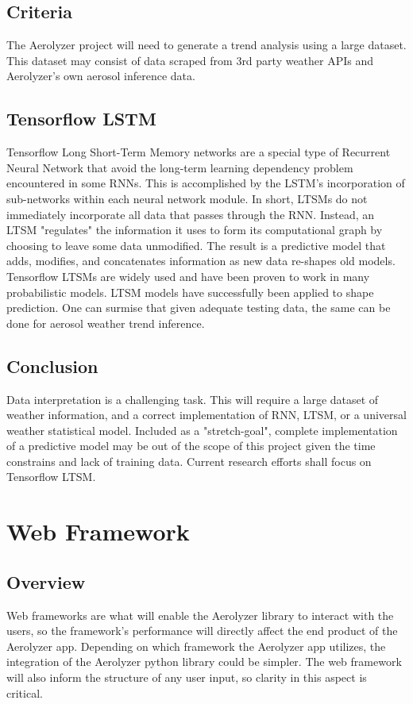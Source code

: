 \documentclass[onecolumn, draftclsnofoot,10pt, compsoc]{IEEEtran}
\begin{document}
\begin{singlespace}
	\subsection{Criteria}
		The Aerolyzer project will need to generate a trend analysis using a large dataset.
		This dataset may consist of data scraped from 3rd party weather APIs and Aerolyzer’s own aerosol inference data.			

	\subsection{Tensorflow LSTM}
		Tensorflow Long Short-Term Memory networks are a special type of Recurrent Neural Network that avoid the long-term learning dependency problem encountered in some RNNs.
		This is accomplished by the LSTM’s incorporation of sub-networks within each neural network module.
		In short, LTSMs do not immediately incorporate all data that passes through the RNN.
		Instead, an LTSM "regulates" the information it uses to form its computational graph by choosing to leave some data unmodified.
		The result is a predictive model that adds, modifies, and concatenates information as new data re-shapes old models.
		Tensorflow LTSMs are widely used and have been proven to work in many probabilistic models.
		LTSM models have successfully been applied to shape prediction.
		One can surmise that given adequate testing data, the same can be done for aerosol weather trend inference. \cite{LSTM} \cite{LSTM_REG}

	\subsection{Conclusion}
		Data interpretation is a challenging task.
		This will require a large dataset of weather information, and a correct implementation of RNN, LTSM, or a universal weather statistical model.
		Included as a "stretch-goal", complete implementation of a predictive model may be out of the scope of this project given the time constrains and lack of training data.
		Current research efforts shall focus on Tensorflow LTSM.
		

\section{Web Framework}
\subsection{Overview}
Web frameworks are what will enable the Aerolyzer library to interact with the users, so the framework's performance will directly affect the end product of the Aerolyzer app. Depending on which framework the Aerolyzer app utilizes, the integration of the Aerolyzer python library could be simpler. The web framework will also inform the structure of any user input, so clarity in this aspect is critical.

\end{singlespace}
\end{document}
